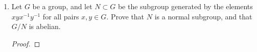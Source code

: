\documentclass[../psets.tex]{subfiles}
\begin{document}
\begin{enumerate}
\begin{proof}
\begin{gather*}
{\begin{pmatrix}
                    1 & -1\\
                    -1 & -1\\
                \end{pmatrix}
            }_{\phi(i)}
            \underbrace{
                \begin{pmatrix}
                    0 & -1\\
                    1 & 0\\
                \end{pmatrix}
            }_{\phi(k)}
            =
            \underbrace{
                \begin{pmatrix}
                    1 & 1\\
                    1 & -1\\
                \end{pmatrix}
            }_{\phi(j)}\\
            \underbrace{
                \begin{pmatrix}
                    1 & -1\\
                    -1 & -1\\
                \end{pmatrix}^2
            }_{\phi(i)^2}
            =
            \underbrace{
                \begin{pmatrix}
                    1 & 1\\
                    1 & -1\\
                \end{pmatrix}^2
            }_{\phi(j)^2}
            =
            \underbrace{
                \begin{pmatrix}
                    0 & -1\\
                    1 & 0\\
                \end{pmatrix}^2
            }_{\phi(k)^2}
            =
            -\underbrace{
                \begin{pmatrix}
                    1 & 0\\
                    0 & 1\\
                \end{pmatrix}
            }_{\phi(e)}
        \end{gather*}
        Suppose for the sake of contradiction that $S_4\cong\text{SL}_2(\F_3)$ with isomorphism $\psi:S_4\to\text{SL}_2(\F_3)$. $D_8\leq S_4$ and $H\leq\text{SL}_2(\F_3)$ are both 2-Sylows in their respective groups. Thus, by Sylow II, $\psi(D_8)$ and $H$ are conjugate to each other. But as discussed in class, the $Q\nsim D_8$, a contradiction.
    \end{proof}
    \item Let $G$ be a group, and let $N\subset G$ be the subgroup generated by the elements $xyx^{-1}y^{-1}$ for all pairs $x,y\in G$. Prove that $N$ is a normal subgroup, and that $G/N$ is abelian.
    \begin{proof}


\end{proof}
\end{enumerate}
\end{document}
